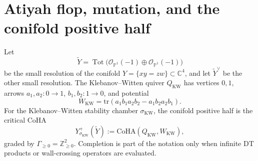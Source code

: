 
\providecommand{\C}{\mathbb{C}}
\providecommand{\Z}{\mathbb{Z}}
\providecommand{\N}{\mathbb{N}}
\providecommand{\bP}{\mathbb{P}}
\providecommand{\cO}{\mathcal{O}}
\providecommand{\cA}{\mathcal{A}}
\providecommand{\cH}{\mathcal{H}}
\providecommand{\cZ}{\mathcal{Z}}
\providecommand{\Yplus}{Y^{+}}
\providecommand{\CoHA}{\mathrm{CoHA}}
\providecommand{\Db}{D^{b}}
\providecommand{\Coh}{\mathrm{Coh}}
\providecommand{\Rep}{\mathrm{Rep}}
\providecommand{\tr}{\mathrm{tr}}
\providecommand{\Jac}{\mathrm{Jac}}
\providecommand{\kch}{\kappa_{\mathrm{ch}}}
\providecommand{\kcat}{\kappa_{\mathrm{cat}}}
\providecommand{\kBKM}{\kappa_{\mathrm{BKM}}}
\providecommand{\kfiber}{\kappa_{\mathrm{fiber}}}
\providecommand{\Eone}{E_{1}}
\providecommand{\Etwo}{E_{2}}
\providecommand{\fgl}{\mathfrak{gl}}
\providecommand{\FMflop}{\Phi_{\mathrm{flop}}}
\providecommand{\Thetaflop}{\Theta_{\mathrm{flop}}}
\providecommand{\Twall}{\mathbb{T}_{\Gamma}}
\providecommand{\Dilog}{\mathbb{E}}

\section*{Atiyah flop, mutation, and the conifold positive half}
\label{wn:sec:flop-mutation-Yplus}

Let
\[
  \widetilde Y=\operatorname{Tot}\bigl(\cO_{\bP^1}(-1)\oplus
  \cO_{\bP^1}(-1)\bigr)
\]
be the small resolution of the conifold
$Y=\{xy=zw\}\subset\C^{4}$, and let
$\widetilde Y^\vee$ be the other small resolution.  The Klebanov--Witten
quiver $Q_{\mathrm{KW}}$ has vertices $0,1$, arrows
$a_1,a_2\colon0\to1$, $b_1,b_2\colon1\to0$, and potential
\[
  W_{\mathrm{KW}}
  = \tr(a_1b_1a_2b_2-a_1b_2a_2b_1).
\]
For the Klebanov--Witten stability chamber $\sigma_{\mathrm{KW}}$, the
conifold positive half is the critical CoHA
\[
  \Yplus_{\sigma_{\mathrm{KW}}}(\widetilde Y)
  :=
  \CoHA(Q_{\mathrm{KW}},W_{\mathrm{KW}}),
\]
graded by $\Gamma_{\geq 0}=\Z_{\geq0}^{2}$.  Completion is part of the
notation only when infinite DT products or wall-crossing operators are
evaluated.

